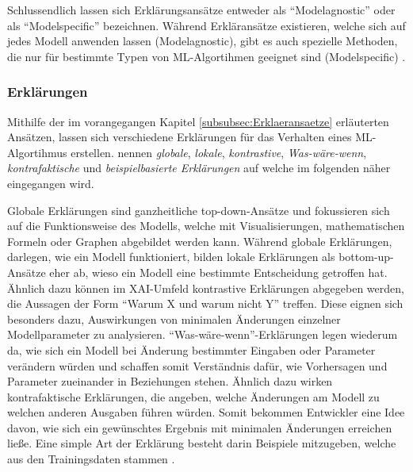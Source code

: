 Schlussendlich lassen sich Erklärungsansätze entweder als \enquote{Modelagnostic} oder als \enquote{Modelspecific} bezeichnen. Während Erkläransätze existieren, welche sich auf jedes Modell anwenden lassen (Modelagnostic), gibt es auch spezielle Methoden, die nur für bestimmte Typen von ML-Algortihmen geeignet sind (Modelspecific) \cite{kamath2021explainable}.

\subsubsection{Erklärungen}
Mithilfe der im vorangegangen Kapitel \ref{subsubsec:Erklaeransaetze} erläuterten Ansätzen, lassen sich verschiedene Erklärungen für das Verhalten eines ML-Algortihmus erstellen. \cite{kamath2021explainable} nennen \emph{globale}, \emph{lokale}, \emph{kontrastive}, \emph{Was-wäre-wenn}, \emph{kontrafaktische} und \emph{beispielbasierte Erklärungen} auf welche im folgenden näher eingegangen wird.

Globale Erklärungen sind ganzheitliche top-down-Ansätze und fokussieren sich auf die Funktionsweise des Modells, welche mit Visualisierungen, mathematischen Formeln oder Graphen abgebildet werden kann. Während globale Erklärungen, darlegen, wie ein Modell funktioniert, bilden lokale Erklärungen als bottom-up-Ansätze eher ab, wieso ein Modell eine bestimmte Entscheidung getroffen hat. Ähnlich dazu können im XAI-Umfeld kontrastive Erklärungen abgegeben werden, die Aussagen der Form \enquote{Warum X und warum nicht Y} treffen. Diese eignen sich besonders dazu, Auswirkungen von minimalen Änderungen einzelner Modellparameter zu analysieren. \enquote{Was-wäre-wenn}-Erklärungen legen wiederum da, wie sich ein Modell bei Änderung bestimmter Eingaben oder Parameter verändern würden und schaffen somit Verständnis dafür, wie Vorhersagen und Parameter zueinander in Beziehungen stehen. Ähnlich dazu wirken kontrafaktische Erklärungen, die angeben, welche Änderungen am Modell zu welchen anderen Ausgaben führen würden. Somit bekommen Entwickler eine Idee davon, wie sich ein gewünschtes Ergebnis mit minimalen Änderungen erreichen ließe. Eine simple Art der Erklärung besteht darin Beispiele mitzugeben, welche aus den Trainingsdaten stammen \cite{kamath2021explainable}.

